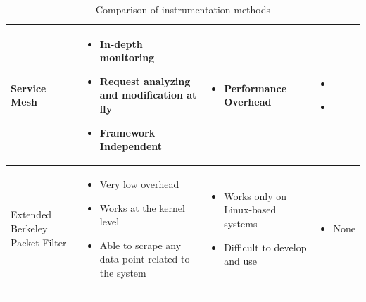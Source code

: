 \begin{longtable}{| p{23mm} | p{42mm} | p{42mm} | p{42mm} |}
    Service Mesh &
    \vspace{-8mm}
    \begin{itemize}[leftmargin=0mm,noitemsep,nolistsep,label={}] 
        \item In-depth monitoring
        \item Request analyzing and modification at fly
        \item Framework Independent
        \vspace{-7mm}
    \end{itemize} &
    \vspace{-8mm}
    \begin{itemize}[leftmargin=0mm,noitemsep,nolistsep,label={}] 
        \item Performance Overhead
        \vspace{-7mm}
    \end{itemize} &
    \vspace{-8mm}
    \begin{itemize}[leftmargin=0mm,noitemsep,nolistsep,label={}] 
        \item \cite{samir2019dla}
        \item \cite{wu2020microrca}
        \vspace{-7mm}
    \end{itemize} \\ \hline
    
    Extended Berkeley Packet Filter &
    \vspace{-8mm}
    \begin{itemize}[leftmargin=0mm,noitemsep,nolistsep,label={}] 
        \item Very low overhead
        \item Works at the kernel level
        \item Able to scrape any data point related to the system
        \vspace{-7mm}
    \end{itemize} &
    \vspace{-8mm}
    \begin{itemize}[leftmargin=0mm,noitemsep,nolistsep,label={}] 
        \item Works only on Linux-based systems
        \item Difficult to develop and use
        \vspace{-7mm}
    \end{itemize} &
    \vspace{-8mm}
    \begin{itemize}[leftmargin=0mm,noitemsep,nolistsep,label={}] 
        \item None
        \vspace{-7mm}
    \end{itemize} \\ \hline

    \caption{Comparison of instrumentation methods}
\end{longtable}



